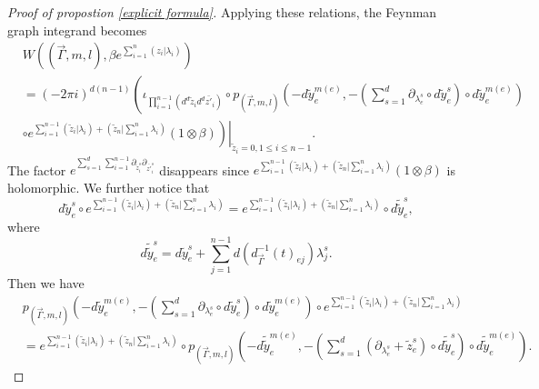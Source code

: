 \documentclass[11pt]{amsart}
\theoremstyle{definition}
\theoremstyle{remark}
\numberwithin{equation}{section}
\begin{document}
\begin{proof}[Proof of propostion \ref{explicit formula}]
    Applying these relations, the Feynman graph integrand becomes
    \begin{align*}
        &W((\vec{\Gamma},m,l),\beta e^{\sum\limits_{i=1}^{n}(z_{i}|\lambda_{i})})\\
        &=(-2\pi i)^{d(n-1)}\left(
        \iota_{\prod_{i=1}^{n-1}(d^{d}\tilde{z}_{i}d^{d}\bar{z'}_{i})}\circ p_{(\vec{\Gamma},m,l)}(-d\tilde{y}_{e}^{m(e)},-(\sum_{s=1}^{d}\partial_{\lambda_{e}^{s}}\circ d\tilde{y}_{e}^{s})\circ d\tilde{y}_{e}^{m(e)})
        \right.\\
        &\left.\left.\circ e^{\sum\limits_{i=1}^{n-1}(\tilde{z}_{i}|\lambda_{i})+(\tilde{z}_{n}|\sum\limits_{i=1}^{n}\lambda_{i})}(1\otimes \beta)\right)\right|_{\tilde{z}_{i}=0,1\leq i\leq n-1}.
    \end{align*}
   The factor $e^{\sum\limits_{s=1}^{d}\sum\limits_{i=1}^{n-1}\partial_{\tilde{z}_{i}^{s}}\partial_{\bar{z'}_{i}^{s}}}$ disappears since $e^{\sum\limits_{i=1}^{n-1}(\tilde{z}_{i}|\lambda_{i})+(\tilde{z}_{n}|\sum\limits_{i=1}^{n}\lambda_{i})}(1\otimes \beta)$ is holomorphic. We further notice that
    $$
    d\tilde{y}_{e}^{s}\circ e^{\sum\limits_{i=1}^{n-1}(\tilde{z}_{i}|\lambda_{i})+(\tilde{z}_{n}|\sum\limits_{i=1}^{n}\lambda_{i})}=e^{\sum\limits_{i=1}^{n-1}(\tilde{z}_{i}|\lambda_{i})+(\tilde{z}_{n}|\sum\limits_{i=1}^{n}\lambda_{i})}\circ d\tilde{\tilde{y}}_{e}^{s},
    $$
    where
    $$
    d\tilde{\tilde{y}}_{e}^{s}=d\tilde{y}_{e}^{s}+\sum_{j=1}^{n-1}d\left(d^{-1}_{\vec{\Gamma}}(t)_{ej}\right)\lambda_{j}^{s}.
    $$
    Then we have
    \begin{align*}
        &p_{(\vec{\Gamma},m,l)}(-d\tilde{y}_{e}^{m(e)},-(\sum_{s=1}^{d}\partial_{\lambda_{e}^{s}}\circ d\tilde{y}_{e}^{s})\circ d\tilde{y}_{e}^{m(e)})\circ e^{\sum\limits_{i=1}^{n-1}(\tilde{z}_{i}|\lambda_{i})+(\tilde{z}_{n}|\sum\limits_{i=1}^{n}\lambda_{i})}\\
        &=e^{\sum\limits_{i=1}^{n-1}(\tilde{z}_{i}|\lambda_{i})+(\tilde{z}_{n}|\sum\limits_{i=1}^{n}\lambda_{i})}\circ p_{(\vec{\Gamma},m,l)}(-d\tilde{\tilde{y}}_{e}^{m(e)},-(\sum_{s=1}^{d}(\partial_{\lambda_{e}^{s}}+\tilde{z}_{e}^{s})\circ d\tilde{\tilde{y}}_{e}^{s})\circ d\tilde{\tilde{y}}_{e}^{m(e)}).
    \end{align*}


\end{proof}
\end{document}
